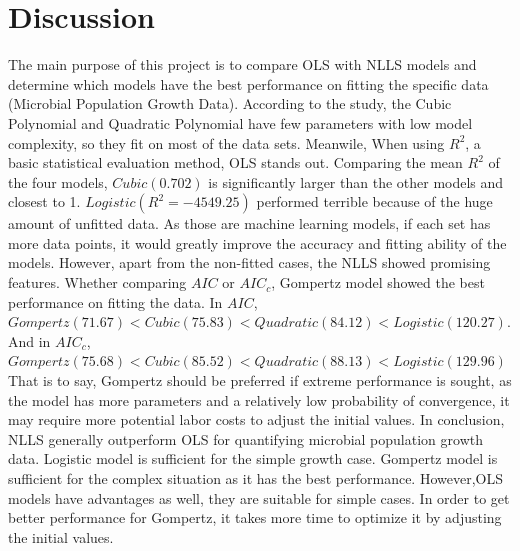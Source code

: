 \documentclass[11pt]{article}
\begin{document}
\section{Discussion}
The main purpose of this project is to compare OLS with NLLS models and determine which models have the best performance on fitting the specific data (Microbial Population Growth Data).
According to the study, the Cubic Polynomial and Quadratic Polynomial have few parameters with low model complexity, so they fit on most of the data sets. Meanwile, When using $R^2$, a basic statistical evaluation method, OLS stands out. 
Comparing the mean $R^2$ of the four models, $Cubic(0.702)$ is significantly larger than the other models and closest to 1. $Logistic(R^2=-4549.25)$ performed terrible because of the huge amount of unfitted data. 
As those are machine learning models, if each set has more data points, it would greatly improve the accuracy and fitting ability of the models.
However, apart from the non-fitted cases, the NLLS showed promising features. Whether comparing $AIC$ or $AIC_c$, Gompertz model showed the best performance on fitting the data. In $AIC$, $Gompertz(71.67) < Cubic(75.83) < Quadratic(84.12) < Logistic(120.27)$. And in $AIC_c$, $Gompertz(75.68) < Cubic(85.52) < Quadratic(88.13) < Logistic(129.96)$
That is to say, Gompertz should be preferred if extreme performance is sought, as the model has more parameters and a relatively low probability of convergence, it may require more potential labor costs to adjust the initial values.
\newline
In conclusion, NLLS generally outperform OLS for quantifying microbial population growth data. Logistic model is sufficient for the simple growth case. Gompertz model is sufficient for the complex situation as it has the best performance. However,OLS models have advantages as well, they are suitable for simple cases. 
In order to get better performance for Gompertz, it takes more time to optimize it by adjusting the initial values.



\newpage


\end{document}
